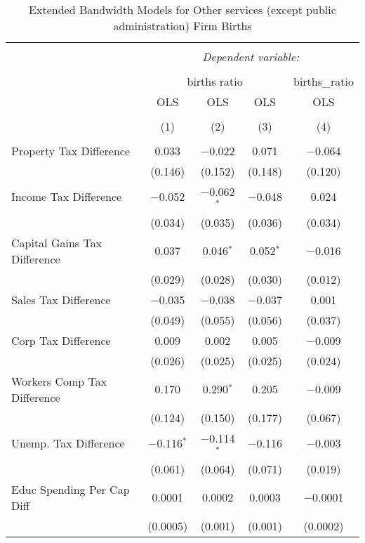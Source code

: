 
\begin{table}[!htbp] \centering 
  \caption{Extended Bandwidth Models for  Other services (except public administration) Firm Births} 
  \label{81eb} 
\begin{tabular}{@{\extracolsep{5pt}}lcccc} 
\\[-1.8ex]\hline 
\hline \\[-1.8ex] 
 & \multicolumn{4}{c}{\textit{Dependent variable:}} \\ 
\cline{2-5} 
\\[-1.8ex] & \multicolumn{3}{c}{births ratio} & births\_ratio \\ 
 & OLS & OLS & OLS & OLS \\ 
\\[-1.8ex] & (1) & (2) & (3) & (4)\\ 
\hline \\[-1.8ex] 
 Property Tax Difference & 0.033 & $-$0.022 & 0.071 & $-$0.064 \\ 
  & (0.146) & (0.152) & (0.148) & (0.120) \\ 
  Income Tax Difference & $-$0.052 & $-$0.062$^{*}$ & $-$0.048 & 0.024 \\ 
  & (0.034) & (0.035) & (0.036) & (0.034) \\ 
  Capital Gains Tax Difference & 0.037 & 0.046$^{*}$ & 0.052$^{*}$ & $-$0.016 \\ 
  & (0.029) & (0.028) & (0.030) & (0.012) \\ 
  Sales Tax Difference & $-$0.035 & $-$0.038 & $-$0.037 & 0.001 \\ 
  & (0.049) & (0.055) & (0.056) & (0.037) \\ 
  Corp Tax Difference & 0.009 & 0.002 & 0.005 & $-$0.009 \\ 
  & (0.026) & (0.025) & (0.025) & (0.024) \\ 
  Workers Comp Tax Difference & 0.170 & 0.290$^{*}$ & 0.205 & $-$0.009 \\ 
  & (0.124) & (0.150) & (0.177) & (0.067) \\ 
  Unemp. Tax Difference & $-$0.116$^{*}$ & $-$0.114$^{*}$ & $-$0.116 & $-$0.003 \\ 
  & (0.061) & (0.064) & (0.071) & (0.019) \\ 
  Educ Spending Per Cap Diff & 0.0001 & 0.0002 & 0.0003 & $-$0.0001 \\ 
  & (0.0005) & (0.001) & (0.001) & (0.0002) \\ 

\end{tabular}
\end{table}
